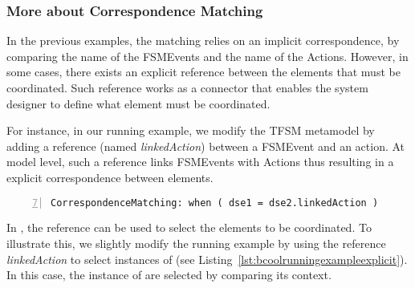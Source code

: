 \subsubsection{More about Correspondence Matching}
\label{subsubsec:explicitcorrespondence}

In the previous examples, the matching relies on an implicit correspondence, \ie by comparing the name of the FSMEvents and the name of the Actions. However, in some cases, there exists an explicit reference between the elements that must be coordinated. Such reference works as a connector that enables the system designer to define what element must be coordinated. 
	
For instance, in our running example, we modify the TFSM metamodel by adding a reference (named \emph{linkedAction}) between a FSMEvent and an action. At model level, such a reference links FSMEvents with Actions thus resulting in a explicit correspondence between elements.
	
\begin{lstlisting}[language=bcool,
	caption={A correspondence matching that relies on a explicit reference},
	label={lst:bcoolrunningexampleexplicit}, 
	basicstyle=\scriptsize\ttfamily, backgroundcolor=\color{LGrey}, numbers=left, firstnumber=7, xleftmargin=2pt]
	CorrespondenceMatching: when ( dse1 = dse2.linkedAction )
\end{lstlisting}
	
In \bcool, the reference can be used to select the elements to be coordinated. To illustrate this, we slightly modify the running example by using the reference \emph{linkedAction} to select instances of \dse (see Listing~\ref{lst:bcoolrunningexampleexplicit}). In this case, the instance of \dse are selected by comparing its context.  

	
